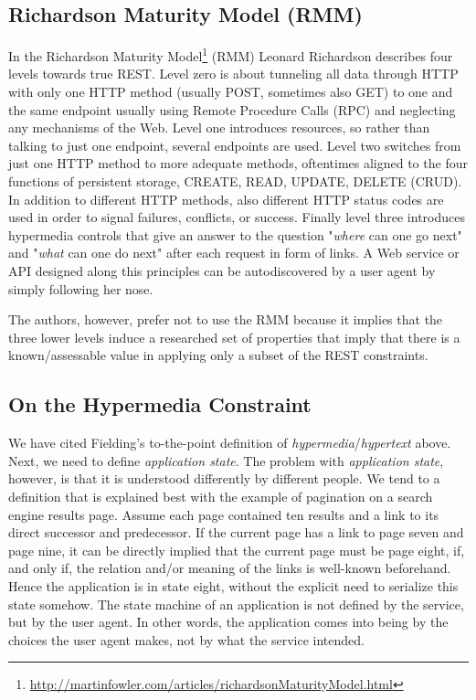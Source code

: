 \documentclass{acm_proc_article-sp}
\begin{document}
\subsection{Richardson Maturity Model (RMM)}\label{sec:rmm}
In the Richardson Maturity Model\footnote{\url{http://martinfowler.com/articles/richardsonMaturityModel.html}} (RMM) Leonard Richardson describes four levels towards true REST. Level zero is about tunneling all data through HTTP with only one HTTP method (usually POST, sometimes also GET) to one and the same endpoint usually using Remote Procedure Calls (RPC) and neglecting any mechanisms of the Web. Level one introduces resources, so rather than talking to just one endpoint, several endpoints are used. Level two switches from just one HTTP method to more adequate methods, oftentimes aligned to the four functions of persistent storage, CREATE, READ, UPDATE, DELETE (CRUD). In addition to different HTTP methods, also different HTTP status codes are used in order to signal failures, conflicts, or success. Finally level three introduces hypermedia controls that give an answer to the question "\textit{where} can one go next" and "\textit{what} can one do next" after each request in form of links. A Web service or API designed along this principles can be autodiscovered by a user agent by simply following her nose.

The authors, however, prefer not to use the RMM because it implies that the three lower levels induce a researched set of properties that imply that there is a known/assessable value in applying only a subset of the REST constraints.

\subsection{On the Hypermedia Constraint}\label{sec:hateoas}
We have cited Fielding's to-the-point definition of \textit{hypermedia}/\textit{hypertext} above. Next, we need to define \textit{application state}. The problem with \textit{application state}, however, is that it is understood differently by different people. We tend to a definition that is explained best with the example of pagination on a search engine results page. Assume each page contained ten results and a link to its direct successor and predecessor. If the current page has a link to page seven and page nine, it can be directly implied that the current page must be page eight, if, and only if, the relation and/or meaning of the links is well-known beforehand. Hence the application is in state eight, without the explicit need to serialize this state somehow. The state machine of an application is not defined by the service, but by the user agent. In other words, the application comes into being by the choices the user agent makes, not by what the service intended.
\end{document}
